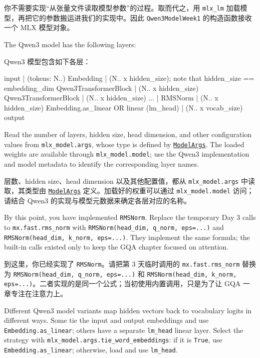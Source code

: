 \documentclass[11pt,a4paper]{article}
\newenvironment{zhpar}{%
  \par\smallskip\begingroup\color{zhcolor}\small\ignorespaces%
}{\endgroup\par\smallskip}
\begin{document}
\begin{zhpar}
你不需要实现“从张量文件读取模型参数”的过程。取而代之，用 \texttt{mlx\_lm} 加载模型，再把它的参数搬运进我们的实现中。因此 \texttt{Qwen3ModelWeek1} 的构造函数接收一个 MLX 模型对象。
\end{zhpar}
The Qwen3 model has the following layers:

\begin{zhpar}
Qwen3 模型包含如下各层：
\end{zhpar}
\begin{codeblock}
input
| (tokens: N..)
Embedding
| (N.. x hidden_size); note that hidden_size == embedding_dim
Qwen3TransformerBlock
| (N.. x hidden_size)
Qwen3TransformerBlock
| (N.. x hidden_size)
...
|
RMSNorm 
| (N.. x hidden_size)
Embedding.as_linear OR linear (lm_head)
| (N.. x vocab_size)
output
\end{codeblock}

Read the number of layers, hidden size, head dimension, and other configuration values from \texttt{mlx\_model.args}, whose type is defined by \href{https://github.com/ml-explore/mlx-lm/blob/main/mlx_lm/models/qwen3.py}{\texttt{ModelArgs}}. The loaded weights are available through \texttt{mlx\_model.model}; use the Qwen3 implementation and model metadata to identify the corresponding layer names.

\begin{zhpar}
层数、hidden size、head dimension 以及其他配置值，都从 \texttt{mlx\_model.args} 中读取，其类型由 \href{https://github.com/ml-explore/mlx-lm/blob/main/mlx_lm/models/qwen3.py}{\texttt{ModelArgs}} 定义。加载好的权重可以通过 \texttt{mlx\_model.model} 访问；请结合 Qwen3 的实现与模型元数据来确定各层对应的名称。
\end{zhpar}
By this point, you have implemented \texttt{RMSNorm}. Replace the temporary Day 3 calls to \texttt{mx.fast.rms\_norm} with \texttt{RMSNorm(head\_dim, q\_norm, eps=...)} and \texttt{RMSNorm(head\_dim, k\_norm, eps=...)}. They implement the same formula; the built-in calls existed only to keep the GQA chapter focused on attention.

\begin{zhpar}
到这里，你已经实现了 \texttt{RMSNorm}。请把第 3 天临时调用的 \texttt{mx.fast.rms\_norm} 替换为 \texttt{RMSNorm(head\_dim, q\_norm, eps=...)} 和 \texttt{RMSNorm(head\_dim, k\_norm, eps=...)}。二者实现的是同一个公式；当初使用内置调用，只是为了让 GQA 一章专注在注意力上。
\end{zhpar}
Different Qwen3 model variants map hidden vectors back to vocabulary logits in different ways. Some tie the input and output embeddings and use \texttt{Embedding.as\_linear}; others have a separate \texttt{lm\_head} linear layer. Select the strategy with \texttt{mlx\_model.args.tie\_word\_embeddings}: if it is \texttt{True}, use \texttt{Embedding.as\_linear}; otherwise, load and use \texttt{lm\_head}.
\end{document}
